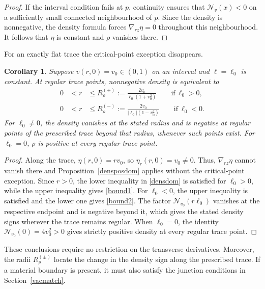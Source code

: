 \documentclass[amsmath,amsfonts,amssymb,aps,pra,superscriptaddress,10pt]{revtex4-2}
\numberwithin{equation}{section}
\theoremstyle{plain}
\newtheorem{corollary}{Corollary}
\theoremstyle{definition}
\theoremstyle{remark}
\theoremstyle{definition}
\newcommand{\ellzero}{\ell_0}
\begin{document}
\begin{proof}
If the interval condition fails at $p$, continuity ensures that $\mathcal{N}_v(x)<0$ on a sufficiently small connected neighbourhood of $p$. Since the density is nonnegative, the density formula forces $\nabla_{rz}\eta=0$ throughout this neighbourhood. It follows that $\eta$ is constant and $\rho$ vanishes there.
\end{proof}

For an exactly flat trace the critical-point exception disappears.

\begin{corollary}
Suppose $v(r,0)=v_0\in(0,1)$ on an interval and $\ell=\ellzero$ is constant. At regular trace points, nonnegative density is equivalent to
\begin{eqnarray}
0&<r&\leq R_\rho^{(+)}:=\frac{2v_0}{\ellzero(1+v_0^2)}\qquad\text{if}~\ellzero>0,\label{bound1}\\
0&<r&\leq R_\rho^{(-)}:=\frac{2v_0}{|\ellzero|(1-v_0^2)}\qquad\text{if}~\ellzero<0.\label{bound2}
\end{eqnarray}
For $\ellzero\neq 0$, the density vanishes at the stated radius and is negative at regular points of the prescribed trace beyond that radius, whenever such points exist. For $\ellzero=0$, $\rho$ is positive at every regular trace point.
\end{corollary}

\begin{proof}
Along the trace, $\eta(r,0)=rv_0$, so $\eta_r(r,0)=v_0\neq 0$. Thus, $\nabla_{rz}\eta$ cannot vanish there and Proposition~\ref{densposdom} applies without the critical-point exception. Since $r>0$, the lower inequality in \eqref{densdom} is satisfied for $\ellzero>0$, while the upper inequality gives \eqref{bound1}. For $\ellzero<0$, the upper inequality is satisfied and the lower one gives \eqref{bound2}. The factor $\mathcal{N}_{v_0}(r\ellzero)$ vanishes at the respective endpoint and is negative beyond it, which gives the stated density signs wherever the trace remains regular. When $\ellzero=0$, the identity $\mathcal{N}_{v_0}(0)=4v_0^2>0$ gives strictly positive density at every regular trace point.
\end{proof}

These conclusions require no restriction on the transverse derivatives. Moreover, the radii $R_\rho^{(\pm)}$ locate the change in the density sign along the prescribed trace. If a material boundary is present, it must also satisfy the junction conditions in Section~\ref{vacmatch}.
\end{document}
